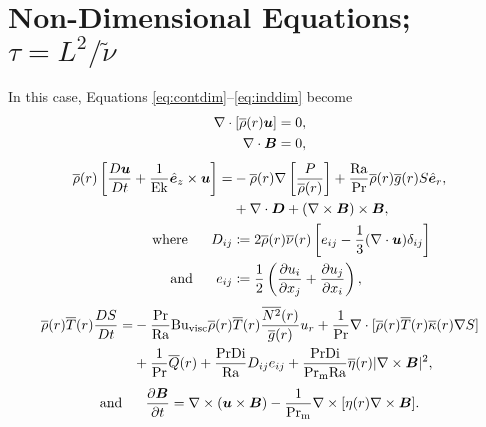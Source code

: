 \documentclass[12pt]{article}
\numberwithin{equation}{section}
\begin{document}
	\section{Non-Dimensional Equations; $\tau=L^2/\tilde{\nu}$}
	In this case, Equations \eqref{eq:contdim}--\eqref{eq:inddim} become 
	\begin{align}
	\nabla\cdot[\overline{\rho}(r)\bm{u}] &= 0\label{eq:contndvisc},\\
	\nabla\cdot \bm{B} &= 0,
\end{align}
\begin{subequations}\label{eq:momndvisc}
	\begin{align}
		\overline{\rho}(r)\left[\frac{D\bm{u}}{Dt}+\frac{1}{{\rm{Ek}}}\hat{\bm{e}}_z\times\bm{u}\right] = &-\overline{\rho}(r)\nabla\left[ \frac{P}{\overline{\rho}(r)} \right] + \frac{{\rm{Ra}}}{{\rm{Pr}}}\overline{\rho}(r)\overline{g}(r) S\hat{\bm{e}}_r, \nonumber\\
		&+\nabla\cdot\bm{D} +(\nabla\times\bm{B})\times\bm{B},\\
		\text{where}\ \ \ \ \  D_{ij} &\coloneqq 2\overline{\rho}(r)\overline{\nu}(r) \left[e_{ij} - \frac{1}{3}(\nabla\cdot\bm{u}) \delta_{ij} \right]\\
		\text{and}\ \ \ \ \  e_{ij} &\coloneqq \frac{1}{2}\left(\frac{\partial u_i}{\partial x_j} + \frac{\partial u_j}{\partial x_i} \right),
	\end{align}
\end{subequations}
\begin{align}\label{eq:enndvisc}
	\overline{\rho}(r)\overline{T}(r) \frac{DS}{Dt} = &- \frac{{\rm{Pr}}}{{\rm{Ra}}}{\rm{Bu_{visc}}}\overline{\rho}(r)\overline{T}(r) \frac{\overline{N^2}(r)}{\overline{g}(r)} u_r + \frac{1}{{\rm{Pr}}} \nabla\cdot[\overline{\rho}(r) \overline{T}(r) \overline{\kappa}(r) \nabla S] \nonumber \\
	&+ \frac{1}{{\rm{Pr}}} \overline{Q}(r) + \frac{{\rm{Pr}}{\rm{Di}}}{{\rm{Ra}}} D_{ij}e_{ij} + \frac{{\rm{Pr}}{\rm{Di}}}{{\rm{Pr_m}}{\rm{Ra}}} \overline{\eta}(r)|\nabla\times\bm{B}|^2,
\end{align}
\begin{align}\label{eq:indndvisc}
	\text{and}\ \ \ \ \  \frac{\partial\bm{B}}{\partial t} = \nabla\times(\bm{u}\times\bm{B}) - \frac{1}{{\rm{Pr_m}}} \nabla\times[\eta(r)\nabla\times\bm{B}].
\end{align}	
\end{document}
